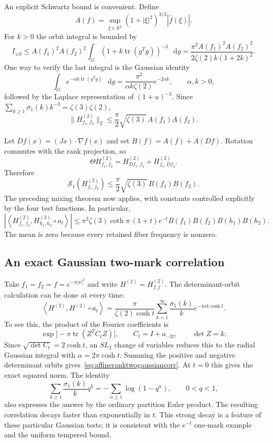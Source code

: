 \documentclass[11pt,a4paper]{article}
\numberwithin{equation}{section}
\theoremstyle{definition}
\theoremstyle{remark}
\newcommand{\dd}{\mathop{}\!\mathrm d}
\newcommand{\RR}{\mathbb R}
\begin{document}
An explicit Schwartz bound is convenient. Define
\[
 A(f)=\sup_{\xi\in\RR^2}
       (1+|\xi|^2)^{3/2}|\widehat f(\xi)|.
\]
For $k>0$ the orbit integral is bounded by
\[
 I_{\pm k}\leq
 A(f_1)^2A(f_2)^2
 \int_G(1+k\operatorname{tr}(g^Tg))^{-3}\,\dd g
 =\frac{\pi^2 A(f_1)^2A(f_2)^2}
        {2\zeta(2)k(1+2k)^2}.
\]
One way to verify the last integral is the Gaussian identity
\[
 \int_G e^{-\alpha k\operatorname{tr}(g^Tg)}\,\dd g
 =\frac{\pi^2}{\alpha k\zeta(2)}e^{-2\alpha k},
 \qquad \alpha,k>0,
\]
followed by the Laplace representation of $(1+u)^{-3}$.
Since $\sum_{k\geq1}\sigma_1(k)k^{-3}=\zeta(3)\zeta(2)$,
\begin{equation}
 \boxed{
 \|H_{f_1,f_2}^{(2)}\|_2
 \leq\frac\pi2\sqrt{\zeta(3)}\,A(f_1)A(f_2).
 }
 \label{eq:affineranktwoschwartz}
\end{equation}

Let $Df(x)=(Jx)\cdot\nabla f(x)$ and set $B(f)=A(f)+A(Df)$.
Rotation commutes with the rank projection, so
\[
 \Theta H_{f_1,f_2}^{(2)}
 =H_{Df_1,f_2}^{(2)}+H_{f_1,Df_2}^{(2)}.
\]
Therefore
\begin{equation}
 \mathcal S_1(H_{f_1,f_2}^{(2)})
 \leq\frac\pi2\sqrt{\zeta(3)}\,B(f_1)B(f_2).
 \label{eq:affineranktwoKnorm}
\end{equation}
The preceding mixing theorem now applies, with constants controlled
explicitly by the four test functions. In particular,
\[
 \left|\left\langle H_{f_1,f_2}^{(2)},
       H_{h_1,h_2}^{(2)}\circ a_t\right\rangle\right|
 \leq\pi^2\zeta(3)\coth\pi\,(1+t)e^{-t}
       B(f_1)B(f_2)B(h_1)B(h_2).
\]
The mean is zero because every retained fiber frequency is nonzero.

\subsection{An exact Gaussian two-mark correlation}
\label{subsec:affineranktwogaussian}

Take $f_1=f_2=f=e^{-\pi|x|^2}$ and write $H^{(2)}=H_{f,f}^{(2)}$.
The determinant-orbit calculation can be done at every time:
\begin{equation}
 \boxed{
 \left\langle H^{(2)},H^{(2)}\circ a_t\right\rangle
 =\frac{\pi}{\zeta(2)\cosh t}
       \sum_{k=1}^\infty\frac{\sigma_1(k)}k
                         e^{-4\pi k\cosh t}.
 }
 \label{eq:affineranktwogaussiancorr}
\end{equation}
To see this, the product of the Fourier coefficients is
\[
 \exp\bigl[-\pi\operatorname{tr}(Z^TC_tZ)\bigr],
 \qquad C_t=I+a_{-2t},\qquad \det Z=k.
\]
Since $\sqrt{\det C_t}=2\cosh t$, an $SL_2$ change of variables
reduces this to the radial Gaussian integral with
$\alpha=2\pi\cosh t$. Summing the positive and negative determinant
orbits gives~\eqref{eq:affineranktwogaussiancorr}. At $t=0$ this gives
the exact squared norm. The identity
\[
 \sum_{k\geq1}\frac{\sigma_1(k)}k q^k
 =-\sum_{n\geq1}\log(1-q^n),\qquad 0<q<1,
\]
also expresses the answer by the ordinary partition Euler product.
The resulting correlation decays faster than exponentially in $t$.
This strong decay is a feature of these particular Gaussian tests;
it is consistent with the $e^{-t}$ one-mark example and the uniform
tempered bound.
\end{document}
